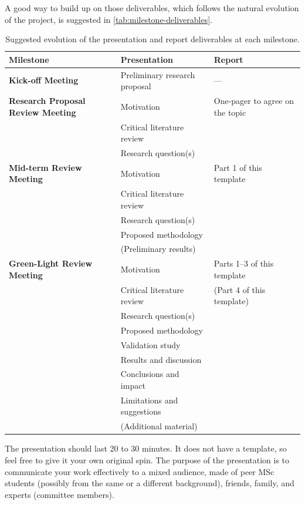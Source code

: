 A good way to build up on those deliverables, which follows the natural evolution of the project, is suggested in \autoref{tab:milestone-deliverables}.

\begin{table}
    \centering
    \begin{tabular}{lll}
        \toprule
        \textbf{Milestone} & \textbf{Presentation} & \textbf{Report} \\
        \midrule
        \textbf{Kick-off Meeting} & Preliminary research proposal & --- \\[\medskipamount]
        \textbf{Research Proposal Review Meeting} & Motivation & One-pager to agree on the topic \\
        & Critical literature review & \\
        & Research question(s) & \\[\medskipamount]
        \textbf{Mid-term Review Meeting} & Motivation & Part 1 of this template \\
        & Critical literature review & \\
        & Research question(s) & \\
        & Proposed methodology & \\
        & (Preliminary results) & \\[\medskipamount]
        \textbf{Green-Light Review Meeting} & Motivation & Parts 1--3 of this template \\
        & Critical literature review & (Part 4 of this template) \\
        & Research question(s) & \\
            & Proposed methodology & \\
            & Validation study & \\
            & Results and discussion & \\
            & Conclusions and impact & \\
            & Limitations and suggestions & \\
            & (Additional material) & \\[\medskipamount]
        \bottomrule
    \end{tabular}
    \caption{Suggested evolution of the presentation and report deliverables at each milestone.}
    \label{tab:milestone-deliverables}
\end{table}


The presentation should last 20 to 30 minutes.
It does not have a template, so feel free to give it your own original spin.
The purpose of the presentation is to communicate your work effectively to a mixed audience, made of peer MSc students (possibly from the same or a different background), friends, family, and experts (committee members).





